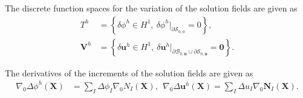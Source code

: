 \documentclass[11pt,a4paper,final]{article}
\begin{document}
\noindent The discrete function spaces for the variation of the solution fields are given as
\begin{align}
T^h &= \left\lbrace \delta\phi^h \in H^1, \ \delta\phi^h|_{\partial \mathcal{S}_{0, \phi}} = 0 \right\rbrace, \\
\mathbf{V}^h &= \left\lbrace \delta\mathbf{u}^h \in H^1, \ \delta\mathbf{u}^h|_{\partial \mathcal{B}_{0, \mathbf{u}} \cup \partial \mathcal{S}_{0, \mathbf{u}}} = \mathbf{0} \right\rbrace.
\end{align}

\noindent The derivatives of the increments of the solution fields are given as
\begin{align}
\nabla_0 \Delta \phi^h (\mathbf{X}) &= \sum\limits_{I} \Delta \phi_I \nabla_0 N_I (\mathbf{X}), \ \ \nabla_0 \Delta \mathbf{u}^h (\mathbf{X}) = \sum\limits_{I} \Delta u_I \nabla_0 \mathbf{N}_I (\mathbf{X}).
\end{align} \newline
\end{document}

